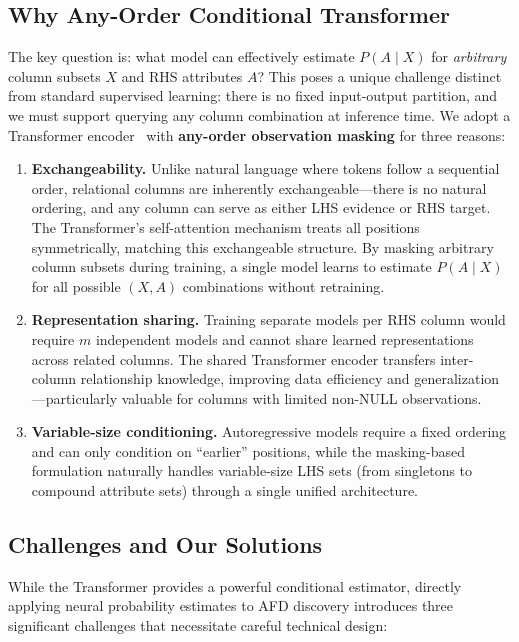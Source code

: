 \documentclass[conference]{IEEEtran}
\begin{document}
\subsection*{Why Any-Order Conditional Transformer}

The key question is: what model can effectively estimate $P(A \mid X)$ for \emph{arbitrary} column subsets $X$ and RHS attributes $A$? This poses a unique challenge distinct from standard supervised learning: there is no fixed input-output partition, and we must support querying any column combination at inference time. We adopt a Transformer encoder~\cite{tabtransformer} with \textbf{any-order observation masking} for three reasons:

\begin{enumerate}
    \item \textbf{Exchangeability.} Unlike natural language where tokens follow a sequential order, relational columns are inherently exchangeable---there is no natural ordering, and any column can serve as either LHS evidence or RHS target. The Transformer's self-attention mechanism treats all positions symmetrically, matching this exchangeable structure. By masking arbitrary column subsets during training, a single model learns to estimate $P(A \mid X)$ for all possible $(X, A)$ combinations without retraining.
    \item \textbf{Representation sharing.} Training separate models per RHS column would require $m$ independent models and cannot share learned representations across related columns. The shared Transformer encoder transfers inter-column relationship knowledge, improving data efficiency and generalization---particularly valuable for columns with limited non-NULL observations.
    \item \textbf{Variable-size conditioning.} Autoregressive models require a fixed ordering and can only condition on ``earlier'' positions, while the masking-based formulation naturally handles variable-size LHS sets (from singletons to compound attribute sets) through a single unified architecture.
\end{enumerate}

\subsection*{Challenges and Our Solutions}

While the Transformer provides a powerful conditional estimator, directly applying neural probability estimates to AFD discovery introduces three significant challenges that necessitate careful technical design:
\end{document}

